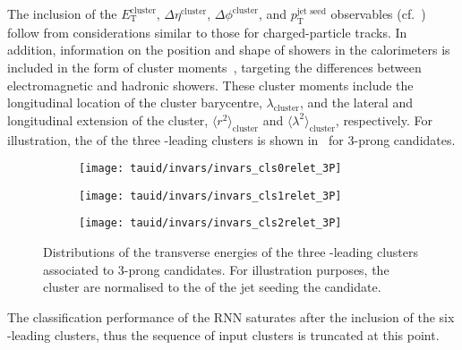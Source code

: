 The inclusion of the $E_{\text{T}}^{\text{cluster}}$,
$\Delta \eta^{\text{cluster}}$, $\Delta \phi^{\text{cluster}}$, and
$p_{\text{T}}^{\text{jet seed}}$ observables
(cf.~) follow from considerations
similar to those for charged-particle tracks. In addition, information
on the position and shape of showers in the calorimeters is included
in the form of cluster moments~\cite{PERF-2014-07}, targeting the
differences between electromagnetic and hadronic showers. These
cluster moments include the longitudinal location of the cluster
barycentre, $\lambda_{\text{cluster}}$, and the lateral and
longitudinal extension of the cluster,
$\langle r^2 \rangle_{\text{cluster}}$ and
$\langle \lambda^2 \rangle_{\text{cluster}}$, respectively. For
illustration, the \ET of the three \ET-leading clusters is shown
in~ for 3-prong \tauhadvis
candidates.

\begin{figure}[htbp]
  \centering

  \begin{subfigure}{0.33\textwidth}
    \texttt{[image: tauid/invars/invars\_cls0relet\_3P]}
    \subcaption{}%
    \label{fig:tauid_low_level_variables_cluster0}
  \end{subfigure}%
  \begin{subfigure}{0.33\textwidth}
    \texttt{[image: tauid/invars/invars\_cls1relet\_3P]}
    \subcaption{}%
    \label{fig:tauid_low_level_variables_cluster1}
  \end{subfigure}%
  \begin{subfigure}{0.33\textwidth}
    \texttt{[image: tauid/invars/invars\_cls2relet\_3P]}
    \subcaption{}%
    \label{fig:tauid_low_level_variables_cluster2}
  \end{subfigure}

  \caption[Distributions of the transverse energy of the three \ET-leading
  clusters associated to 3-prong \tauhadvis candidates.]{Distributions of the
    transverse energies of the three \ET-leading clusters associated to 3-prong
    \tauhadvis candidates. For illustration purposes, the cluster \ET are
    normalised to the \pT of the jet seeding the \tauhadvis candidate.}%
  \label{fig:tauid_low_level_variables_cluster}
\end{figure}

The classification performance of the RNN \tauid saturates after the
inclusion of the six \ET-leading clusters, thus the sequence of input
clusters is truncated at this point.


